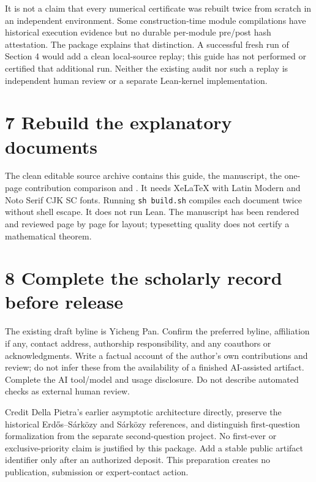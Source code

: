 \documentclass[10pt,letterpaper]{article}
\begin{document}
It is not a claim that every numerical certificate was rebuilt twice from scratch in an independent environment. Some construction-time module compilations have historical execution evidence but no durable per-module pre/post hash attestation. The package explains that distinction. A successful fresh run of Section 4 would add a clean local-source replay; this guide has not performed or certified that additional run. Neither the existing audit nor such a replay is independent human review or a separate Lean-kernel implementation.

\section*{7 Rebuild the explanatory documents}
The clean editable source archive contains this guide, the manuscript, the one-page contribution comparison and . It needs XeLaTeX with Latin Modern and Noto Serif CJK SC fonts. Running \texttt{sh build.sh} compiles each document twice without shell escape. It does not run Lean. The manuscript has been rendered and reviewed page by page for layout; typesetting quality does not certify a mathematical theorem.

\section*{8 Complete the scholarly record before release}
The existing draft byline is Yicheng Pan. Confirm the preferred byline, affiliation if any, contact address, authorship responsibility, and any coauthors or acknowledgments. Write a factual account of the author's own contributions and review; do not infer these from the availability of a finished AI-assisted artifact. Complete the AI tool/model and usage disclosure. Do not describe automated checks as external human review.

Credit Della Pietra's earlier asymptotic architecture directly, preserve the historical Erdős--Sárközy and Sárközy references, and distinguish first-question formalization from the separate second-question project. No first-ever or exclusive-priority claim is justified by this package. Add a stable public artifact identifier only after an authorized deposit. This preparation creates no publication, submission or expert-contact action.
\end{document}
